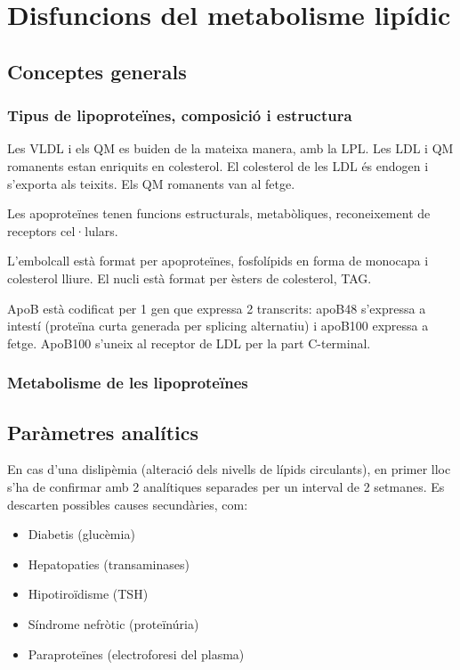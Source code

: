 \section{Disfuncions del metabolisme lipídic}
\label{sec:disf-del-metab}

\subsection{Conceptes generals}
\label{sec:conceptes-generals}

\subsubsection{Tipus de lipoproteïnes, composició i estructura}
\label{sec:tipus-de-lipopr}


Les VLDL i els QM es buiden de la mateixa manera, amb la LPL. Les LDL
i QM romanents estan enriquits en colesterol. El colesterol de les LDL
és endogen i s'exporta als teixits. Els QM romanents van al fetge.

Les apoproteïnes tenen funcions estructurals, metabòliques,
reconeixement de receptors cel·lulars.

L'embolcall està format per apoproteïnes, fosfolípids en forma de
monocapa i colesterol lliure. El nucli està format per èsters de
colesterol, TAG.


ApoB està codificat per 1 gen que expressa 2 transcrits: apoB48
s'expressa a intestí (proteïna curta generada per splicing alternatiu)
i apoB100 expressa a fetge. ApoB100 s'uneix al receptor de LDL per la
part C-terminal.


\subsubsection{Metabolisme de les lipoproteïnes}
\label{sec:metabolisme-de-les}



\subsection{Paràmetres analítics}
\label{sec:parametres-analitics}
En cas d'una dislipèmia (alteració dels nivells de lípids circulants),
en primer lloc s'ha de confirmar amb 2 analítiques separades per un
interval de 2 setmanes. Es descarten possibles causes secundàries,
com:
\begin{itemize}
\item Diabetis (glucèmia)
\item Hepatopaties (transaminases)
\item Hipotiroïdisme (TSH)
\item Síndrome nefròtic (proteïnúria)
\item Paraproteïnes (electroforesi del plasma)
\end{itemize}

